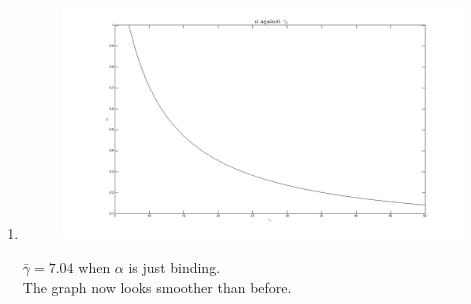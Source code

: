 \begin{enumerate}
\item
\begin{figure}[htbp]
\centering
\includegraphics[width=\linewidth]{Figure/Q3_2.png}
\end{figure}
$\bar{\gamma}=7.04$ when $\alpha$ is just binding.\\
The graph now looks smoother than before.
\end{enumerate}
